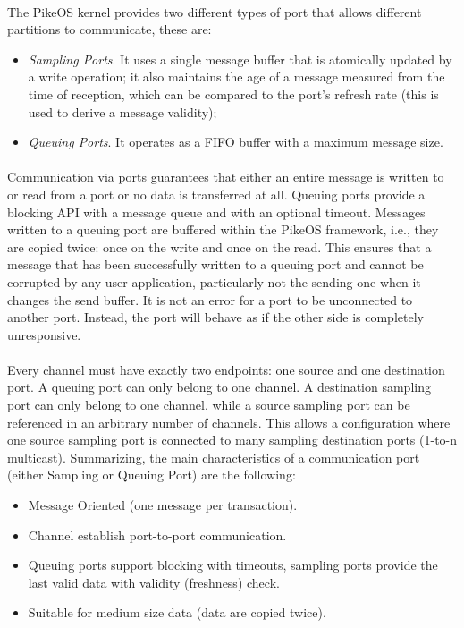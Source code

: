 \paragraph{} The PikeOS  kernel provides two different types of port that allows different partitions to communicate, these are:
\begin{itemize}
\item \emph{Sampling Ports}. It uses a single message buffer that is atomically updated by a write operation; it also maintains the age of a message measured from the time of reception, which can be compared to the port’s refresh rate (this is used to derive a message validity);
\item \emph{Queuing Ports}. It operates as a FIFO buffer with a maximum message size.
\end{itemize}

\paragraph{}Communication via ports guarantees that either an entire message is written to or read from a port or no data is transferred at all. Queuing ports provide a blocking API with a message queue and with an optional timeout. Messages written to a queuing port are buffered within the PikeOS framework, i.e., they are copied twice: once on the write and once on the read. This ensures that a message that has been successfully written to a queuing port and cannot be corrupted by any user application, particularly not the sending one when it changes the send buffer. It is not an error for a port to be unconnected to another port. Instead, the port will behave as if the other side is completely unresponsive.

\paragraph{} Every channel must have exactly two endpoints: one source and one destination port. A queuing port can only belong to one channel. A destination sampling port can only belong to one channel, while a source sampling port can be referenced in an arbitrary number of channels. This allows a configuration where one source sampling port is connected to many sampling destination ports (1-to-n multicast). Summarizing, the main characteristics of a communication port (either Sampling or Queuing Port) are the following:
\begin{itemize}
\item Message Oriented (one message per transaction).
\item Channel establish port-to-port communication.
\item Queuing ports support blocking with timeouts, sampling ports provide the last valid data with validity (freshness) check.
\item Suitable for medium size data (data are copied twice).
\end{itemize}

